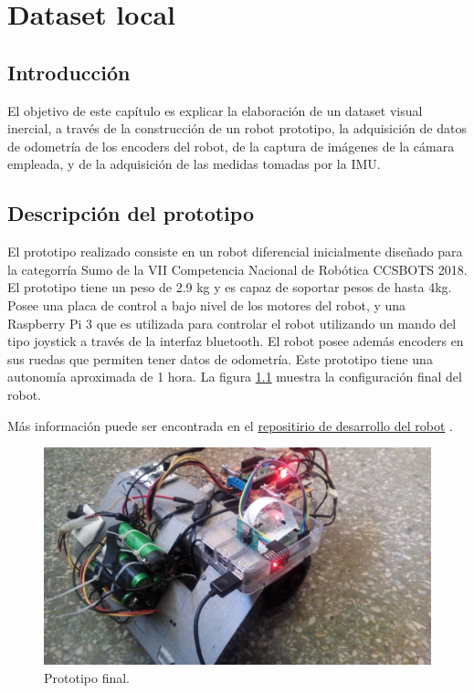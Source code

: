 \chapter{Dataset local}
\label{capitulo6}


\section{Introducción}
El objetivo de este capítulo es explicar la elaboración de un dataset visual inercial, a través de la construcción de un robot prototipo, la adquisición de datos de odometría de los encoders del robot, de la captura de imágenes de la cámara empleada, y de la adquisición de las medidas tomadas por la IMU.


\clearpage

\section{Descripción del prototipo}

El prototipo realizado consiste en un robot diferencial inicialmente diseñado para la categorría Sumo de la VII Competencia Nacional de Robótica CCSBOTS 2018. El prototipo tiene un peso de 2.9 kg y es capaz de soportar pesos de hasta 4kg. Posee una placa de control a bajo nivel de los motores del robot, y una Raspberry Pi 3 que es utilizada para controlar el robot utilizando un mando del tipo joystick a través de la interfaz bluetooth. El robot posee además encoders en sus ruedas que permiten tener datos de odometría. Este prototipo tiene una autonomía aproximada de 1 hora. La figura \ref{imagen:Robot} muestra la configuración final del robot. 

Más información puede ser encontrada en el \href{https://github.com/Robot-Sumo/}{repositirio de desarrollo del robot} .


\begin{figure}[H]
	\centering		\includegraphics[width=0.7\linewidth]{imagenes/prototipo/Robot}
	\caption{Prototipo final.}
	\label{imagen:Robot}
\end{figure}


